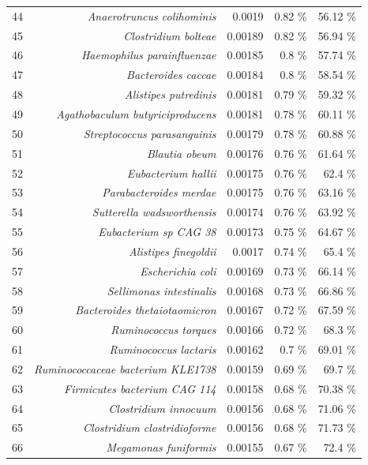 \documentclass{article}
\begin{document}
\begin{table}
\begin{centering}
\begin{tabular}{|r|r|r|r|r|}
  44 & \textit{Anaerotruncus colihominis} & 0.0019 & 0.82 \% & 56.12 \% \\
  45 & \textit{Clostridium bolteae} & 0.00189 & 0.82 \% & 56.94 \% \\
  46 & \textit{Haemophilus parainfluenzae} & 0.00185 & 0.8 \% & 57.74 \% \\
  47 & \textit{Bacteroides caccae} & 0.00184 & 0.8 \% & 58.54 \% \\
  48 & \textit{Alistipes putredinis} & 0.00181 & 0.79 \% & 59.32 \% \\
  49 & \textit{Agathobaculum butyriciproducens} & 0.00181 & 0.78 \% & 60.11 \% \\
  50 & \textit{Streptococcus parasanguinis} & 0.00179 & 0.78 \% & 60.88 \% \\
  51 & \textit{Blautia obeum} & 0.00176 & 0.76 \% & 61.64 \% \\
  52 & \textit{Eubacterium hallii} & 0.00175 & 0.76 \% & 62.4 \% \\
  53 & \textit{Parabacteroides merdae} & 0.00175 & 0.76 \% & 63.16 \% \\
  54 & \textit{Sutterella wadsworthensis} & 0.00174 & 0.76 \% & 63.92 \% \\
  55 & \textit{Eubacterium sp CAG 38} & 0.00173 & 0.75 \% & 64.67 \% \\
  56 & \textit{Alistipes finegoldii} & 0.0017 & 0.74 \% & 65.4 \% \\
  57 & \textit{Escherichia coli} & 0.00169 & 0.73 \% & 66.14 \% \\
  58 & \textit{Sellimonas intestinalis} & 0.00168 & 0.73 \% & 66.86 \% \\
  59 & \textit{Bacteroides thetaiotaomicron} & 0.00167 & 0.72 \% & 67.59 \% \\
  60 & \textit{Ruminococcus torques} & 0.00166 & 0.72 \% & 68.3 \% \\
  61 & \textit{Ruminococcus lactaris} & 0.00162 & 0.7 \% & 69.01 \% \\
  62 & \textit{Ruminococcaceae bacterium KLE1738} & 0.00159 & 0.69 \% & 69.7 \% \\
  63 & \textit{Firmicutes bacterium CAG 114} & 0.00158 & 0.68 \% & 70.38 \% \\
  64 & \textit{Clostridium innocuum} & 0.00156 & 0.68 \% & 71.06 \% \\
  65 & \textit{Clostridium clostridioforme} & 0.00156 & 0.68 \% & 71.73 \% \\
  66 & \textit{Megamonas funiformis} & 0.00155 & 0.67 \% & 72.4 \% \\

\end{tabular}
\end{centering}
\end{table}
\end{document}
